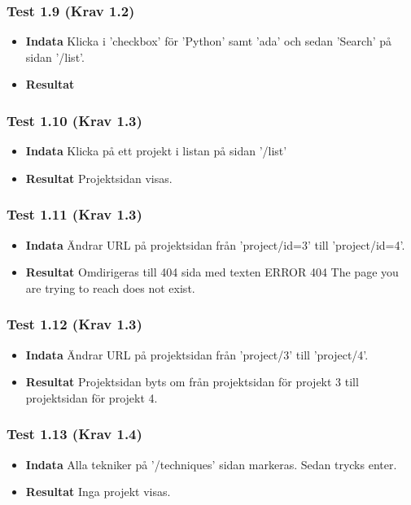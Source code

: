 \documentclass{TDP003mall}
\begin{document}
\subsubsection*{Test 1.9 (Krav 1.2)}
\begin{itemize}
\item[]\textbf{Indata} Klicka i 'checkbox' för 'Python' samt 'ada' och sedan 'Search' på sidan '/list'.
\item[]\textbf{Resultat} 
\end{itemize}
\subsubsection*{Test 1.10 (Krav 1.3)}
\begin{itemize}
\item[]\textbf{Indata} Klicka på ett projekt i listan på sidan '/list'
\item[]\textbf{Resultat} Projektsidan visas.
\end{itemize}
\subsubsection*{Test 1.11 (Krav 1.3)}
\begin{itemize}
\item[]\textbf{Indata} Ändrar URL på projektsidan från 'project/id=3' till 'project/id=4'.
\item[]\textbf{Resultat} Omdirigeras till 404 sida med texten ERROR 404 The page you are trying to reach does not exist.
\end{itemize}
\subsubsection*{Test 1.12 (Krav 1.3)}
\begin{itemize}
\item[]\textbf{Indata} Ändrar URL på projektsidan från 'project/3' till 'project/4'.
\item[]\textbf{Resultat} Projektsidan byts om från projektsidan för projekt 3 till projektsidan för projekt 4.
\end{itemize}
\subsubsection*{Test 1.13 (Krav 1.4)}
\begin{itemize}
\item[]\textbf{Indata} Alla tekniker på '/techniques' sidan markeras. Sedan trycks enter.
\item[]\textbf{Resultat} Inga projekt visas.
\end{itemize}
\end{document}
